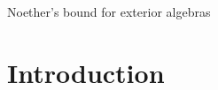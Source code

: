 \documentclass[a4paper,11pt]{article}
\begin{document}
\begin{center}
    \huge{Noether's bound for exterior algebras}
\end{center}

\section{Introduction}






{}
\end{document}

